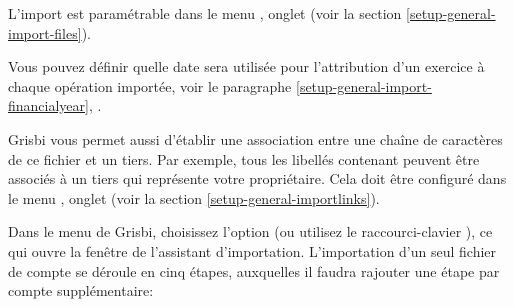 L'import est paramétrable dans le menu , onglet  (voir la section \vref{setup-general-import-files}).

Vous pouvez définir quelle date sera utilisée pour l'attribution d'un exercice à chaque opération importée, voir le paragraphe \vref{setup-general-import-financialyear}, .

Grisbi vous permet aussi d'établir une association entre une chaîne de caractères de ce fichier et un tiers. Par exemple, tous les libellés contenant  peuvent être associés à un tiers qui représente votre propriétaire. Cela doit être configuré dans le menu , onglet  (voir la section \vref{setup-general-importlinks}).

Dans le menu  de Grisbi, choisissez l'option  (ou utilisez le raccourci-clavier ), ce qui ouvre la fenêtre de l'assistant d'importation. L'importation d'un seul fichier de compte se déroule en cinq étapes, auxquelles il faudra rajouter une étape par compte supplémentaire:

